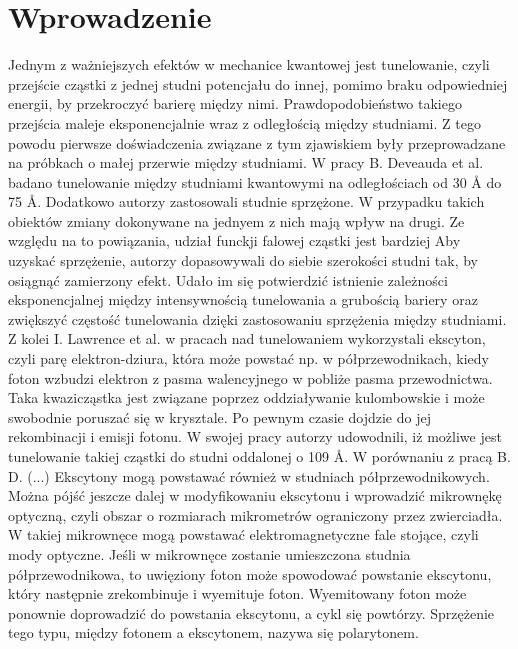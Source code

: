 \documentclass[licencjacka]{pracamgr}
\begin{document}
\chapter*{Wprowadzenie}
%
Jednym z ważniejszych efektów w mechanice kwantowej jest tunelowanie, czyli przejście cząstki z jednej studni potencjału do innej, pomimo braku odpowiedniej energii, by przekroczyć barierę między nimi. Prawdopodobieństwo takiego przejścia maleje eksponencjalnie wraz z odległością między studniami. Z tego powodu pierwsze doświadczenia związane z tym zjawiskiem były przeprowadzane na próbkach o małej przerwie między studniami. W pracy B. Deveauda et al. \cite{1990} badano tunelowanie między studniami kwantowymi na odległościach od 30 \r{A} do 75 \r{A}. Dodatkowo autorzy zastosowali studnie sprzężone. W przypadku takich obiektów zmiany dokonywane na jednyem z nich mają wpływ na drugi. Ze względu na to powiązania, udział funckji falowej cząstki jest bardziej  Aby uzyskać sprzężenie, autorzy dopasowywali do siebie szerokości studni tak, by osiągnąć zamierzony efekt. Udało im się potwierdzić istnienie zależności eksponencjalnej między intensywnością tunelowania a grubością bariery oraz zwiększyć częstość tunelowania dzięki zastosowaniu sprzężenia między studniami. Z kolei I. Lawrence et al. \cite{1994} w pracach nad tunelowaniem wykorzystali ekscyton, czyli parę elektron-dziura, która może powstać np. w półprzewodnikach, kiedy foton wzbudzi elektron z pasma walencyjnego w pobliże pasma przewodnictwa. Taka kwazicząstka jest związane poprzez oddziaływanie kulombowskie i może swobodnie poruszać się w krysztale. Po pewnym czasie dojdzie do jej rekombinacji i emisji fotonu. W swojej pracy autorzy udowodnili, iż możliwe jest tunelowanie takiej cząstki do studni oddalonej o 109 \r{A}. W porównaniu z pracą B. D. (...) Ekscytony mogą powstawać również w studniach półprzewodnikowych. %
Można pójść jeszcze dalej w modyfikowaniu ekscytonu i wprowadzić mikrownękę optyczną, czyli obszar o rozmiarach mikrometrów ograniczony przez zwierciadła. W takiej mikrownęce mogą powstawać elektromagnetyczne fale stojące, czyli mody optyczne. Jeśli w mikrownęce zostanie umieszczona studnia półprzewodnikowa, to uwięziony foton może spowodować powstanie ekscytonu, który następnie zrekombinuje i wyemituje foton. Wyemitowany foton może ponownie doprowadzić do powstania ekscytonu, a cykl się powtórzy. Sprzężenie tego typu, między fotonem a ekscytonem, nazywa się polarytonem. %
\end{document}

